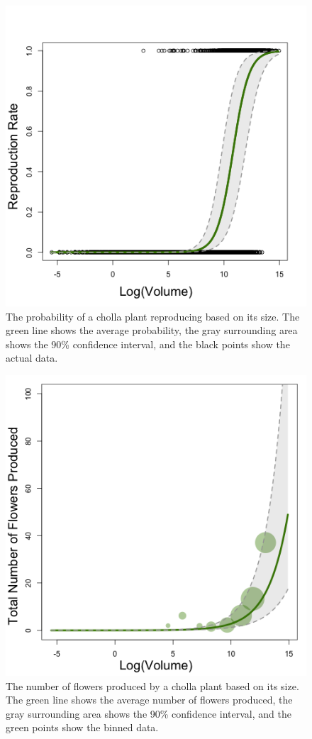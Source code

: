 \documentclass[11pt]{article}
\begin{document}
\begin{figure}
	\includegraphics[width=0.91\linewidth]{Figures/repro_panel.png}
	\caption{The probability of a cholla plant reproducing based on its size. The green line shows the average probability, the gray surrounding area shows the 90\% confidence interval, and the black points show the actual data. }
	\label{app:repro}
\end{figure}

\renewcommand{\thefigure}{A\arabic{figure}}


\begin{figure}
	\includegraphics[width=0.91\linewidth]{Figures/flow.png}
	\caption{The number of flowers produced by a cholla plant based on its size. The green line shows the average number of flowers produced, the gray surrounding area shows the 90\% confidence interval, and the green points show the binned data. }
	\label{app:flow}
\end{figure}
\end{document}
